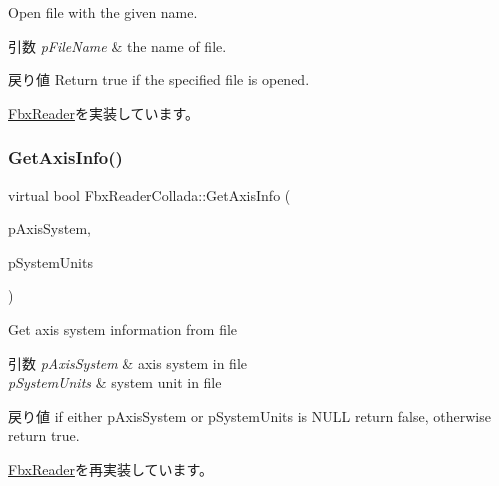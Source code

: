 Open file with the given name. 
\begin{DoxyParams}{引数}
{\em p\+File\+Name} & the name of file. \\
\hline
\end{DoxyParams}
\begin{DoxyReturn}{戻り値}
Return true if the specified file is opened. 
\end{DoxyReturn}


\hyperlink{class_fbx_reader_a6105bd37ae86c03f35aee6f62901856d}{Fbx\+Reader}を実装しています。

\mbox{\label{class_fbx_reader_collada_aed6cb43bb8262e63260088ad8abcf2e6}} 
\subsubsection{\texorpdfstring{Get\+Axis\+Info()}{GetAxisInfo()}}
{\footnotesize\ttfamily virtual bool Fbx\+Reader\+Collada\+::\+Get\+Axis\+Info (\begin{DoxyParamCaption}\item[{\hyperlink{class_fbx_axis_system}{Fbx\+Axis\+System} $\ast$}]{p\+Axis\+System,  }\item[{\hyperlink{class_fbx_system_unit}{Fbx\+System\+Unit} $\ast$}]{p\+System\+Units }\end{DoxyParamCaption})\hspace{0.3cm}{\ttfamily [virtual]}}

Get axis system information from file 
\begin{DoxyParams}{引数}
{\em p\+Axis\+System} & axis system in file \\
\hline
{\em p\+System\+Units} & system unit in file \\
\hline
\end{DoxyParams}
\begin{DoxyReturn}{戻り値}
if either p\+Axis\+System or p\+System\+Units is {\ttfamily N\+U\+LL} return {\ttfamily false}, otherwise return {\ttfamily true}. 
\end{DoxyReturn}


\hyperlink{class_fbx_reader_a73e58c3f7734250f0f8ffaef96b2df3f}{Fbx\+Reader}を再実装しています。

\mbox{\label{class_fbx_reader_collada_a23cea871d527b8695ebdeade47b1938e}} 
